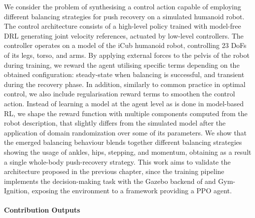 We consider the problem of synthesising a control action capable of employing different balancing strategies for push recovery on a simulated humanoid robot.
The control architecture consists of a high-level policy trained with model-free \ac{DRL} generating joint velocity references, actuated by low-level \pid controllers.
The controller operates on a model of the iCub humanoid robot, controlling 23 \acp{DoF} of its legs, torso, and arms.
By applying external forces to the pelvis of the robot during training, we reward the agent utilising specific terms depending on the obtained configuration: steady-state when balancing is successful, and transient during the recovery phase.
In addition, similarly to common practice in optimal control, we also include regularisation reward terms to smoothen the control action.
Instead of learning a model at the agent level as is done in model-based \ac{RL}, we shape the reward function with multiple components computed from the robot description, that slightly differs from the simulated model after the application of domain randomization over some of its parameters.
We show that the emerged balancing behaviour blends together different balancing strategies showing the usage of ankles, hips, stepping, and momentum, obtaining as a result a single whole-body push-recovery strategy.
This work aims to validate the architecture proposed in the previous chapter, since the training pipeline implements the decision-making task with the Gazebo backend of \scenario and Gym-Ignition, exposing the environment to a framework providing a \ac{PPO} agent.

\paragraph{Contribution Outputs}


